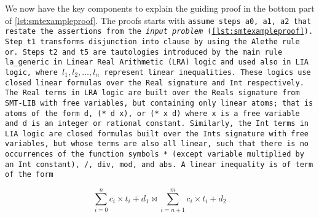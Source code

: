 We now have the key components to explain the guiding proof in the bottom part of \cref{lst:smtexampleproof}.
The proofs starts with \tt{assume} steps \tt{a0}, \tt{a1}, \tt{a2} that restate the assertions from the \textit{input problem} (\cref{lst:smtexampleproof}).
Step \tt{t1} transforms disjunction into clause by using the Alethe rule \tt{or}.
Steps \tt{t2} and \tt{t5} are tautologies introduced by the main rule \tt{la\_generic}
in Linear Real Arithmetic (LRA) logic and used also in LIA logic, where \colorbox{green!30}{$l_1, l_2,\dots, l_n$} represent linear inequalities.
These logics use closed linear formulas over the \lstinline[language=SMT,basicstyle=\ttfamily\footnotesize]{Real} signature and \lstinline[language=SMT,basicstyle=\ttfamily\footnotesize]{Int} respectively.
The \lstinline[language=SMT,basicstyle=\ttfamily\footnotesize]{Real} terms in \tt{LRA} logic are built over the Reals signature from SMT-LIB with free variables, but containing only linear atoms; that is
atoms of the form \lstinline[language=SMT,basicstyle=\ttfamily\footnotesize]{d}, \lstinline[language=SMT,basicstyle=\ttfamily\footnotesize]{(* d x)}, or \lstinline[language=SMT,basicstyle=\ttfamily\footnotesize]{(* x d)}  where \lstinline[language=SMT,basicstyle=\ttfamily\footnotesize]{x} is a free variable and  \lstinline[language=SMT,basicstyle=\ttfamily\footnotesize]{d} is an integer or rational constant.
Similarly, the \lstinline[language=SMT,basicstyle=\ttfamily\footnotesize]{Int} terms in \tt{LIA} logic are closed formulas built over the
Ints signature with free variables, but whose terms are also all linear, such that there is no occurrences of the function symbols \lstinline[language=SMT,basicstyle=\ttfamily\footnotesize]{*} (except variable multiplied by an \lstinline[language=SMT,basicstyle=\ttfamily\footnotesize]{Int} constant), \lstinline[language=SMT,basicstyle=\ttfamily\footnotesize]{/}, \lstinline[language=SMT,basicstyle=\ttfamily\footnotesize]{div}, \lstinline[language=SMT,basicstyle=\ttfamily\footnotesize]{mod}, and \lstinline[language=SMT,basicstyle=\ttfamily\footnotesize]{abs}.
A linear inequality is of term of the form

\begin{equation}
\sum_{i=0}^{n}c_i\times{}t_i + d_1\bowtie \sum_{i=n+1}^{m} c_i\times{}t_i + d_2
\label{eqn:inequality}
\end{equation}


